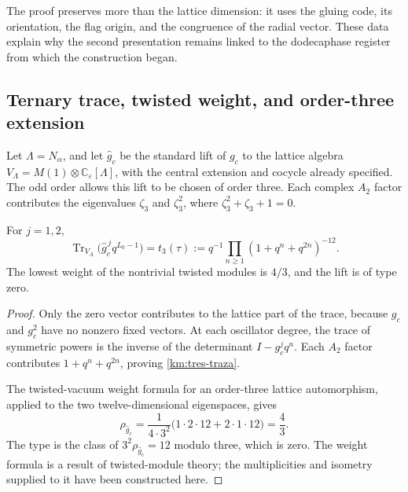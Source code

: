 The proof preserves more than the lattice dimension: it uses the
gluing code, its orientation, the flag origin, and the congruence of the
radial vector. These data explain why the second presentation
remains linked to the dodecaphase register from which the construction began.

\subsection{Ternary trace, twisted weight, and order-three extension}
\label{km:orbifold-tres}

Let \(\Lambda=N_\alpha\), and let \(\widehat g_c\) be the standard
lift of \(g_c\) to the lattice algebra
\(V_\Lambda=M(1)\otimes\mathbb C_\varepsilon[\Lambda]\), with the
central extension and cocycle already specified. The odd order allows
this lift to be chosen of order three. Each complex \(A_2\) factor
contributes the eigenvalues \(\zeta_3\) and \(\zeta_3^2\), where
\(\zeta_3^2+\zeta_3+1=0\).

\begin{proposition}
\label{km:traza-tipo}
For \(j=1,2\),
\begin{equation}
 \operatorname{Tr}_{V_\Lambda}
       \bigl(\widehat g_c^{\,j}q^{L_0-1}\bigr)
 =t_3(\tau)
 :=q^{-1}\prod_{n\ge1}(1+q^n+q^{2n})^{-12}.
 \label{km:tres-traza}
\end{equation}
The lowest weight of the nontrivial twisted modules is \(4/3\), and
the lift is of type zero.
\end{proposition}
\begin{proof}
Only the zero vector contributes to the lattice part of the trace,
because \(g_c\) and \(g_c^2\) have no nonzero fixed vectors.
At each oscillator degree, the trace of symmetric powers is the inverse
of the determinant \(I-g_c^jq^n\). Each \(A_2\) factor contributes
\(1+q^n+q^{2n}\), proving \eqref{km:tres-traza}.

The twisted-vacuum weight formula for an order-three lattice
automorphism, applied to the two twelve-dimensional eigenspaces, gives
\[
 \rho_{\widehat g_c}
 =\frac{1}{4\cdot3^2}
   \bigl(1\cdot2\cdot12+2\cdot1\cdot12\bigr)=\frac43.
\]
The type is the class of \(3^2\rho_{\widehat g_c}=12\) modulo
three, which is zero. The weight formula is a result of twisted-module
theory; the multiplicities and isometry supplied to it
have been constructed here.
\end{proof}

